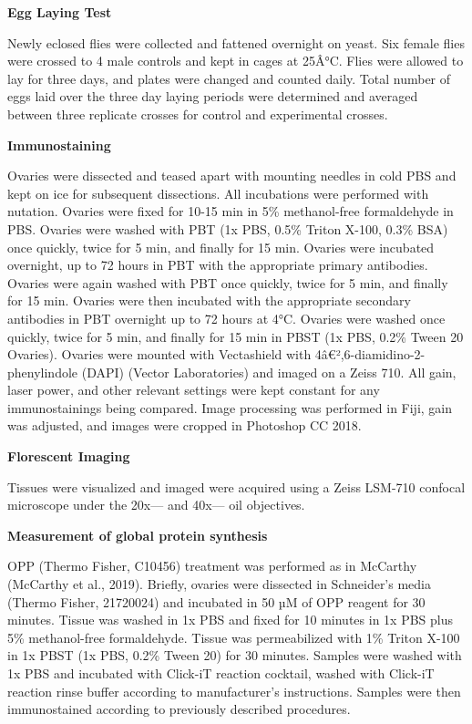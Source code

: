 \documentclass[12pt,oneside]{reedthesis}
\begin{document}
\textbf{Egg Laying Test}

Newly eclosed flies were collected and fattened overnight on yeast. Six female flies were crossed to 4 male controls and kept in cages at 25Â°C. Flies were allowed to lay for three days, and plates were changed and counted daily. Total number of eggs laid over the three day laying periods were determined and averaged between three replicate crosses for control and experimental crosses.

\textbf{Immunostaining}

Ovaries were dissected and teased apart with mounting needles in cold PBS and kept on ice for subsequent dissections. All incubations were performed with nutation. Ovaries were fixed for 10-15 min in 5\% methanol-free formaldehyde in PBS. Ovaries were washed with PBT (1x PBS, 0.5\% Triton X-100, 0.3\% BSA) once quickly, twice for 5 min, and finally for 15 min. Ovaries were incubated overnight, up to 72 hours in PBT with the appropriate primary antibodies. Ovaries were again washed with PBT once quickly, twice for 5 min, and finally for 15 min. Ovaries were then incubated with the appropriate secondary antibodies in PBT overnight up to 72 hours at 4°C. Ovaries were washed once quickly, twice for 5 min, and finally for 15 min in PBST (1x PBS, 0.2\% Tween 20 Ovaries). Ovaries were mounted with Vectashield with 4â€²,6-diamidino-2-phenylindole (DAPI) (Vector Laboratories) and imaged on a Zeiss 710. All gain, laser power, and other relevant settings were kept constant for any immunostainings being compared. Image processing was performed in Fiji, gain was adjusted, and images were cropped in Photoshop CC 2018.

\textbf{Florescent Imaging}

Tissues were visualized and imaged were acquired using a Zeiss LSM-710 confocal microscope under the 20x--- and 40x--- oil objectives.

\textbf{Measurement of global protein synthesis}

OPP (Thermo Fisher, C10456) treatment was performed as in McCarthy (McCarthy et al., 2019). Briefly, ovaries were dissected in Schneider's media (Thermo Fisher, 21720024) and incubated in 50 µM of OPP reagent for 30 minutes. Tissue was washed in 1x PBS and fixed for 10 minutes in 1x PBS plus 5\% methanol-free formaldehyde. Tissue was permeabilized with 1\% Triton X-100 in 1x PBST (1x PBS, 0.2\% Tween 20) for 30 minutes. Samples were washed with 1x PBS and incubated with Click-iT reaction cocktail, washed with Click-iT reaction rinse buffer according to manufacturer's instructions. Samples were then immunostained according to previously described procedures.
\end{document}
